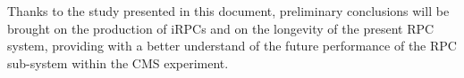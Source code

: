 Thanks to the study presented in this document, preliminary conclusions will be brought on the production of iRPCs and on the longevity of the present RPC system, providing with a better understand of the future performance of the RPC sub-system within the CMS experiment.

\clearpage{\pagestyle{empty}\cleardoublepage}
